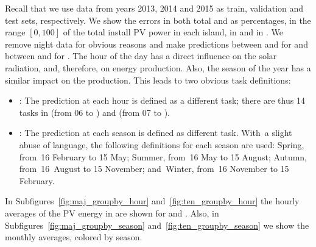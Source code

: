 %
Recall that we use data from years 2013, 2014 and 2015 as train, validation and test sets, respectively.
%
We show the errors in both total \mwhu{} and as percentages, in the range $[0, 100]$ of the total install PV power in each island, {} in  and  in .
%
We remove night data for obvious reasons and make predictions between  and  {for}  and between  and  for .
%
The hour of the day has a direct influence on the solar radiation, and, therefore, on energy production. Also, the season of the year has a similar impact on the production. This leads to two obvious task definitions:
\begin{itemize}
    \item	{}: The prediction at each hour is defined as a different task; there are thus 14 tasks in  (from 06 to ) and  (from 07 to ).
    \item	{}: The prediction at each season is defined as different task.  With~a slight abuse of language, the following definitions for each season are used: Spring, from~16 February to 15 May; Summer, from~16 May to 15 August; Autumn, from~16~August to 15 November; and~Winter, from~16 November to 15 February.
\end{itemize}
%
In Subfigures~\ref{fig:maj_groupby_hour} and~\ref{fig:ten_groupby_hour} the hourly averages of the PV energy in \mwhu{} are shown for  and .
Also, in Subfigures~\ref{fig:maj_groupby_season} and~\ref{fig:ten_groupby_season} we show the monthly averages, colored by season.

